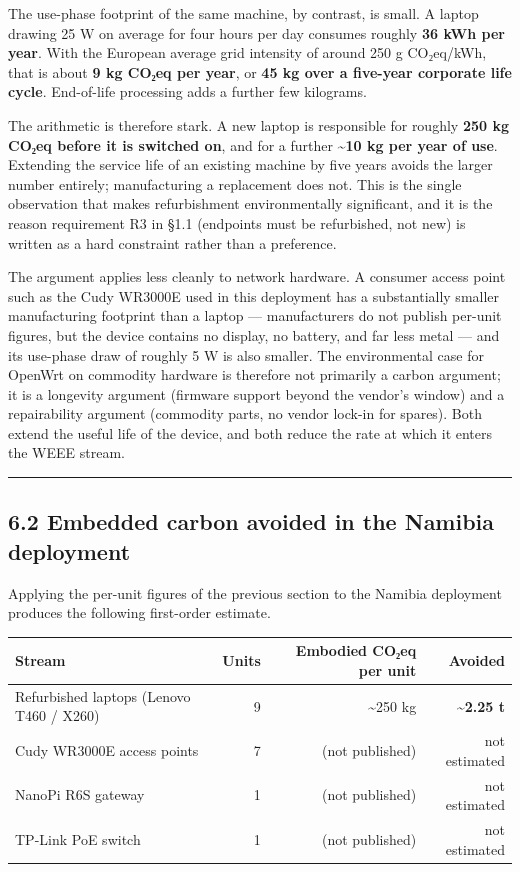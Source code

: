 The use-phase footprint of the same machine, by contrast, is small. A
laptop drawing 25 W on average for four hours per day consumes roughly
\textbf{36 kWh per year}. With the European average grid intensity of
around 250 g CO₂eq/kWh, that is about \textbf{9 kg CO₂eq per year}, or
\textbf{45 kg over a five-year corporate life cycle}. End-of-life
processing adds a further few kilograms.

The arithmetic is therefore stark. A new laptop is responsible for
roughly \textbf{250 kg CO₂eq before it is switched on}, and for a
further \textbf{\textasciitilde10 kg per year of use}. Extending the
service life of an existing machine by five years avoids the larger
number entirely; manufacturing a replacement does not. This is the
single observation that makes refurbishment environmentally significant,
and it is the reason requirement R3 in §1.1 (endpoints must be
refurbished, not new) is written as a hard constraint rather than a
preference.

The argument applies less cleanly to network hardware. A consumer access
point such as the Cudy WR3000E used in this deployment has a
substantially smaller manufacturing footprint than a laptop ---
manufacturers do not publish per-unit figures, but the device contains
no display, no battery, and far less metal --- and its use-phase draw of
roughly 5 W is also smaller. The environmental case for OpenWrt on
commodity hardware is therefore not primarily a carbon argument; it is a
longevity argument (firmware support beyond the vendor's window) and a
repairability argument (commodity parts, no vendor lock-in for spares).
Both extend the useful life of the device, and both reduce the rate at
which it enters the WEEE stream.

\begin{center}\rule{0.5\linewidth}{0.5pt}\end{center}

\hypertarget{embedded-carbon-avoided-in-the-namibia-deployment}{%
\subsection{6.2 Embedded carbon avoided in the Namibia
deployment}\label{embedded-carbon-avoided-in-the-namibia-deployment}}

Applying the per-unit figures of the previous section to the Namibia
deployment produces the following first-order estimate.

\begin{longtable}[]{@{}lrrr@{}}
\toprule\noalign{}
Stream & Units & Embodied CO₂eq per unit & Avoided \\
\midrule\noalign{}
\endhead
\bottomrule\noalign{}
\endlastfoot
Refurbished laptops (Lenovo T460 / X260) & 9 & \textasciitilde250 kg &
\textbf{\textasciitilde2.25 t} \\
Cudy WR3000E access points & 7 & (not published) & not estimated \\
NanoPi R6S gateway & 1 & (not published) & not estimated \\
TP-Link PoE switch & 1 & (not published) & not estimated \\
\end{longtable}

